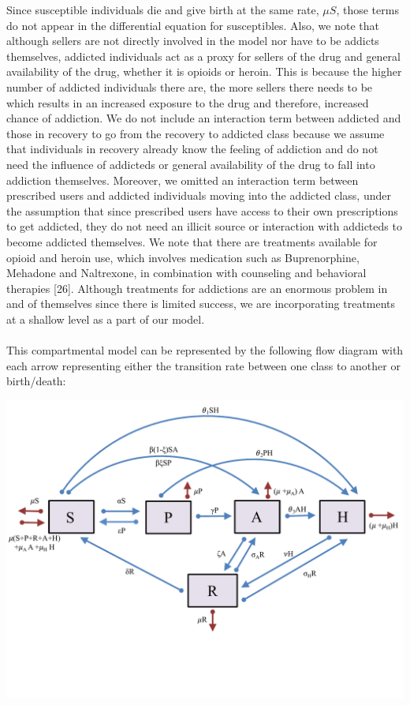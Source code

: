 \documentclass[12pt]{article}
\begin{document}
Since susceptible individuals die and give birth at the same rate, $\mu S$, those terms do not appear in the differential equation for susceptibles. Also, we note that although sellers are not directly involved in the model nor have to be addicts themselves, addicted individuals act as a proxy for sellers of the drug and general availability of the drug, whether it is opioids or heroin. This is because the higher number of addicted individuals there are, the more sellers there needs to be which results in an increased exposure to the drug and therefore, increased chance of addiction. We do not include an interaction term between addicted and those in recovery to go from the recovery to addicted class because we assume that individuals in recovery already know the feeling of addiction and do not need the influence of addicteds or general availability of the drug to fall into addiction themselves. Moreover, we omitted an interaction term between prescribed users and addicted individuals moving into the addicted class, under the assumption that since prescribed users have access to their own prescriptions to get addicted, they do not need an illicit source or interaction with addicteds to become addicted themselves.  We note that there are treatments available for opioid and heroin use, which involves medication such as Buprenorphine, Mehadone and Naltrexone, in combination with counseling and behavioral therapies [26]. Although treatments for addictions are an enormous problem in and of themselves since there is limited success, we are incorporating treatments at a shallow level as a part of our model.     \\ \\
This compartmental model can be represented by the following flow diagram with each arrow representing either the transition rate between one class to another or birth/death: 

\includegraphics[scale=0.6]{heroin_schematic.pdf}
\end{document}
